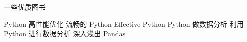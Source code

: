 \begin{frame}{一些优质图书}
    \begin{myoutline}
        \1 Python 高性能优化
            \2 流畅的 Python
            \2 Effective Python
        \1 Python 做数据分析
            \2 利用 Python 进行数据分析
            \2 深入浅出 Pandas
    \end{myoutline}
\end{frame}